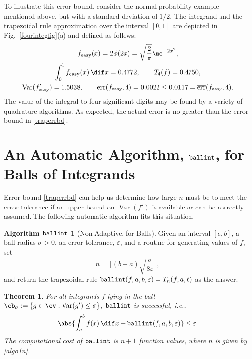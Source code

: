 \documentclass[]{article}
\DeclareMathOperator{\ballinteg}{\texttt{\textup{ballint}}}
\DeclareMathOperator{\Var}{Var}
\DeclareMathOperator{\err}{err}
\newcommand{\oerr}{\overline{\err}}
\newtheorem{theorem}{Theorem}
\theoremstyle{definition}
\newtheorem*{ballalgo}{Algorithm $\ballinteg$}
\theoremstyle{remark}
\begin{document}
To illustrate this error bound, consider the normal probability example mentioned above, but with a standard deviation of $1/2$.  The integrand and the trapezoidal rule approximation over the interval $[0,1]$ are depicted in Fig.\ \ref{fourintegfig}(a) and defined as follows:
\begin{subequations} \label{feasy}
\begin{gather}
f_{\text{easy}}(x) = 2\phi(2x) = \sqrt{\frac{2}{\pi}} \me^{-2x^2}, \\
\int_0^1 f_{\text{easy}}(x)  \, \dif x = 0.4772, \qquad T_{4}(f)= 0.4750, \\
\Var(f'_{\text{easy}}) = 1.5038, \qquad \err(f_{\text{easy}},4)=0.0022 \le 0.0117 = \oerr(f_{\text{easy}},4).
\end{gather}
\end{subequations}
The value of the integral to four significant digits may be found by a variety of quadrature algorithms. As expected, the actual error is no greater than the error bound in \eqref{traperrbd}.

\section{An Automatic Algorithm, $\ballinteg$, for Balls of Integrands} \label{autoballsec}

Error bound \eqref{traperrbd} can help us determine how large $n$ must be to meet the error tolerance if an upper bound on $\Var(f')$ is available or can be correctly assumed. The following automatic algorithm fits this situation.

\begin{ballalgo}[Non-Adaptive, for Balls] \label{ballalgo} Given an interval $[a,b]$, a ball radius $\sigma>0$, an error tolerance, $\varepsilon$, and a routine for generating values of $f$, set 
\begin{equation}\label{algo1n}
n = \Bigg \lceil (b-a)\sqrt{\frac{\sigma}{8\varepsilon}} \Bigg \rceil,
\end{equation}
and return the trapezoidal rule $\ballinteg(f,a,b,\varepsilon)=T_n(f,a,b)$ as the answer.
\end{ballalgo}
\begin{theorem} \label{ballalgothm} For all integrands $f$ lying in the ball $\cb_{\sigma} : =\{g \in \cv : \Var(g') \le \sigma\}$, $\ballinteg$ is successful, i.e., 
\[
\abs{\int_a^b f(x) \, \dif x - \ballinteg(f,a,b,\varepsilon)}\le \varepsilon.
\]
The computational cost of $\ballinteg$ is $n+1$ function values, where $n$ is given by \eqref{algo1n}.
\end{theorem}
\end{document}
